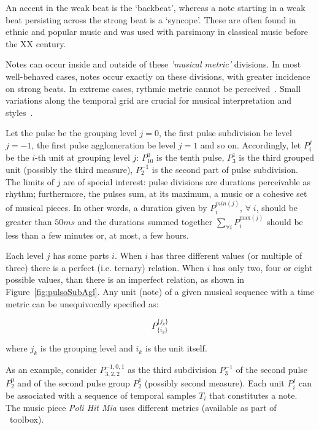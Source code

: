 An accent in the weak beat is the `backbeat', whereas a note starting in a weak beat persisting across the strong beat is a `syncope'.
These are often found in ethnic and popular music and was used with parsimony in classical music before the XX century.

Notes can occur inside and outside of these \emph{'musical metric'} divisions. In most well-behaved cases, notes occur exactly on these divisions, with greater incidence on strong beats.
In extreme cases, rythmic metric cannot be perceived~\cite{Roederer}. 
Small variations along the temporal grid are crucial for musical interpretation and
styles~\cite{Cook}.

Let the pulse be the grouping level $j=0$, the first pulse subdivision be level $j=-1$,
the first pulse agglomeration be level $j=1$ and so on. Accordingly, let $P_i^j$ be the $i$-th unit at grouping level $j$: $P^0_{10}$ is the tenth pulse, $P^{1}_3$ is the third grouped unit (possibly the third measure),
$P^{-1}_2$ is the second part of pulse subdivision. The limits of $j$ are of special interest: pulse divisions are durations perceivable as rhythm; furthermore, the pulses sum, at its maximum, a music or a cohesive set of musical pieces. In other words, a duration given
by $P^{min(j)}_i$, $\forall \; i$, should be greater than $50 ms$ and the durations
summed together $\sum_{\forall i}P^{\text{max}(j)}_i$ should be less than a few
minutes or, at most, a few hours.

Each level $j$ has some parts $i$. When $i$ has three different
values (or multiple of three) there is a perfect (i.e. ternary) relation. When $i$ has only
two, four or eight possible values, than there is an imperfect relation,
as shown in Figure~\ref{fig:pulsoSubAgl}. Any unit (note) of a given musical sequence with a time metric can be unequivocally
specified as:

\begin{equation}\label{eq:rhythmicUnit}
P^{ \{ j_k \} }_{ \{ i_{k} \}}
\end{equation}

\noindent where $j_k$ is the grouping level and $i_k$ is the unit itself.

As an example, consider $P^{-1,0,1}_{3,2,2}$ as the third subdivision $P^{-1}_3$ of the
second pulse $P^0_2$ and of the second pulse group $P^1_2$ (possibly second measure). Each unit $P_i^j$ can be associated with a sequence of temporal samples $T_i$ that constitutes a
note. The music piece \emph{Poli Hit Mia} uses different metrics (available as part of \massa\ toolbox).

